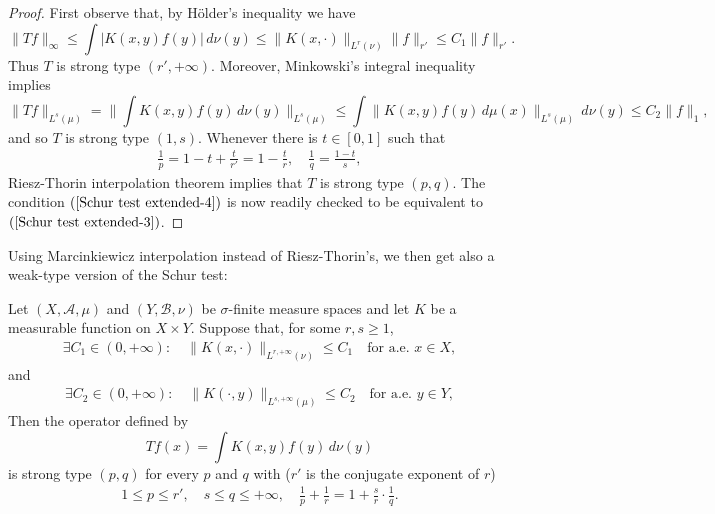 \begin{proof}
First observe that, by H\"older's inequality we have
\[\|Tf\|_\infty\leq\int |K(x,y)f(y)|\,d\nu(y)\leq\|K(x,\cdot)\|_{L^r(\nu)}\|f\|_{r'}\leq C_1\|f\|_{r'}.\]
Thus $T$ is strong type $(r',+\infty)$. Moreover, Minkowski's integral inequality implies
\[\|Tf\|_{L^s(\mu)}=\Big\|\int K(x,y)f(y)\,d\nu(y)\Big\|_{L^s(\mu)}\leq\int\|K(x,y)f(y)\,d\mu(x)\|_{L^s(\mu)}\,d\nu(y)\leq C_2\|f\|_1,\]
and so $T$ is strong type $(1,s)$. Whenever there is $t\in[0,1]$ such that
\begin{align}\label{Schur test extended-4}
\frac{1}{p}=1-t+\frac{t}{r'}=1-\frac{t}{r},\quad\frac{1}{q}=\frac{1-t}{s},
\end{align}
Riesz-Thorin interpolation theorem implies that $T$ is strong type $(p,q)$. The condition $(\ref{Schur test extended-4})$ is now readily checked to be equivalent to $(\ref{Schur test extended-3})$.
\end{proof}
Using Marcinkiewicz interpolation instead of Riesz-Thorin's, we then get also a weak-type version of the Schur test:
\begin{proposition}\label{Schur test extended weak}
Let $(X,\mathcal{A},\mu)$ and $(Y,\mathcal{B},\nu)$ be $\sigma$-finite measure spaces and let $K$ be a measurable function on $X\times Y$. Suppose that, for some $r,s\geq 1$,
\begin{align}\label{Schur test extended weak-1}
\exists C_1\in(0,+\infty):\quad \|K(x,\cdot)\|_{L^{r,+\infty}(\nu)}\leq C_1\quad\text{for a.e. $x\in X$},
\end{align}
and
\begin{align}\label{Schur test extended weak-2}
\exists C_2\in(0,+\infty):\quad \|K(\cdot,y)\|_{L^{s,+\infty}(\mu)}\leq C_2\quad\text{for a.e. $y\in Y$},
\end{align}
Then the operator defined by
\[Tf(x)=\int K(x,y)f(y)\,d\nu(y)\]
is strong type $(p,q)$ for every $p$ and $q$ with ($r'$ is the conjugate exponent of $r$)
\begin{align}\label{Schur test extended weak-3}
1\leq p\leq r',\quad s\leq q\leq+\infty,\quad \frac{1}{p}+\frac{1}{r}=1+\frac{s}{r}\cdot\frac{1}{q}.
\end{align}
\end{proposition}
